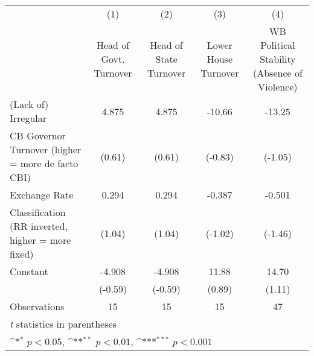 {
\def\sym#1{\ifmmode^{#1}\else\(^{#1}\)\fi}
\begin{tabular}{l*{4}{c}}
\hline\hline
                    &\multicolumn{1}{c}{(1)}&\multicolumn{1}{c}{(2)}&\multicolumn{1}{c}{(3)}&\multicolumn{1}{c}{(4)}\\
                    &\multicolumn{1}{c}{Head of Govt. Turnover}&\multicolumn{1}{c}{Head of State Turnover}&\multicolumn{1}{c}{Lower House Turnover}&\multicolumn{1}{c}{WB Political Stability (Absence of Violence)}\\
\hline
(Lack of) Irregular &       4.875         &       4.875         &      -10.66         &      -13.25         \\
CB Governor Turnover (higher = more de facto CBI)&      (0.61)         &      (0.61)         &     (-0.83)         &     (-1.05)         \\
[1em]
Exchange Rate       &       0.294         &       0.294         &      -0.387         &      -0.501         \\
Classification (RR inverted, higher = more fixed)&      (1.04)         &      (1.04)         &     (-1.02)         &     (-1.46)         \\
[1em]
Constant            &      -4.908         &      -4.908         &       11.88         &       14.70         \\
                    &     (-0.59)         &     (-0.59)         &      (0.89)         &      (1.11)         \\
\hline
Observations        &          15         &          15         &          15         &          47         \\
\hline\hline
\multicolumn{5}{l}{\footnotesize \textit{t} statistics in parentheses}\\
\multicolumn{5}{l}{\footnotesize \sym{*} \(p<0.05\), \sym{**} \(p<0.01\), \sym{***} \(p<0.001\)}\\
\end{tabular}
}

